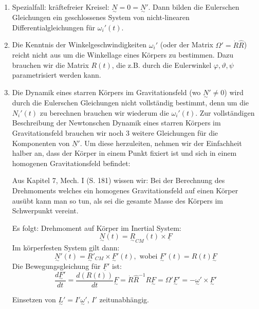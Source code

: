 \documentclass[10pt, letterpaper]{article}
\begin{document}
\begin{enumerate}
\item Spezialfall: kräftefreier Kreisel: $\underset{\sim}{N}=0=\underset{\sim}{N}'$. 
Dann bilden die Eulerschen Gleichungen ein geschlossenes System von nicht-linearen Differentialgleichungen für $\omega_i'(t)$.

\item Die Kenntnis der Winkelgeschwindigkeiten $\omega_i'$ (oder der Matrix $\Omega'=\dot{R}\hat{R}$) reicht nicht aus um die Winkellage eines Körpers zu bestimmen. Dazu brauchen wir die Matrix $R(t)$, die z.B. durch die Eulerwinkel $\varphi,\vartheta,\psi$ parametrisiert werden kann.

\item Die Dynamik eines starren Körpers im Gravitationsfeld (wo $\underset{\sim}{N}'\neq 0$) wird durch die Eulerschen Gleichungen nicht vollständig bestimmt, denn um die $N_i'(t)$ zu berechnen brauchen wir wiederum die $\omega_i'(t)$. Zur vollständigen Beschreibung der Newtonschen Dynamik eines starren Körpers im Gravitationsfeld brauchen wir noch 3 weitere Gleichungen für die Komponenten von $\underline{N}'$. Um diese herzuleiten, nehmen wir der Einfachheit halber an, dass der Körper in einem Punkt fixiert ist und sich in einem homogenen Gravitationsfeld befindet:
\begin{figure}[h]
\centering
{}
\end{figure}
Aus Kapitel 7, Mech. I (S. 181) wissen wir:
Bei der Berechnung des Drehmoments welches ein homogenes Gravitationsfeld auf einen Körper ausübt kann man so tun, als sei die gesamte Masse des Körpers im Schwerpunkt vereint.

Es folgt: Drehmoment auf Körper im Inertial System:
\[\underset{\sim}{N}(t) = \underset{\sim}{R}_{CM}(t) \times \underline{F}\]
Im körperfesten System gilt dann:
\[\underset{\sim}{N}'(t) = \underset{\sim}{R}'_{CM} \times \underset{\sim}{F}'(t), \text{ wobei } \underset{\sim}{F}'(t) = R(t)\underset{\sim}{F}\]
Die Bewegungsgleichung für $\underline{F}'$ ist:
\[\frac{d\underset{\sim}{F}'}{dt} = \frac{d(R(t))}{dt}\underset{\sim}{F} = \dot{R}\hat{R}^{-1}R\underset{\sim}{F} = \Omega'\underset{\sim}{F}' = -\underset{\sim}{\omega}' \times \underset{\sim}{F}'\]

Einsetzen von $\underset{\sim}{L}' = I'\underset{\sim}{\omega}'$, $I'$ zeitunabhängig.

\end{enumerate}
\end{document}
